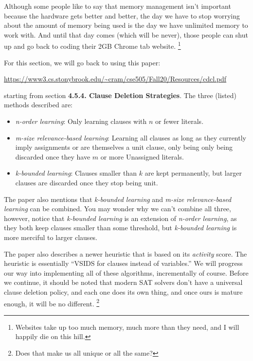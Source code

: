\documentclass[oneside]{book}
\begin{document}
Although some people like to say that memory management isn't important because the 
hardware gets better and better, the day we have to stop worrying about the amount 
of memory being used is the day we have unlimited memory to work with. And until that 
day comes (which will be never), those people can shut up and go back to coding their 
2GB Chrome tab website. 
\footnote{Websites take up too much memory, much more than they need, 
and I will happily die on this hill.}

For this section, we will go back to using this paper:
\begin{center}
    \small{\url{https://www3.cs.stonybrook.edu/~cram/cse505/Fall20/Resources/cdcl.pdf}}
\end{center}
starting from section \textbf{4.5.4. Clause Deletion Strategies}.
The three (listed) methods described are:
\begin{itemize}
    \item \textit{n-order learning}: Only learning clauses with $n$ or fewer literals.
    \item \textit{m-size relevance-based learning}: Learning all clauses as long as they 
            currently imply assignments or are themselves a unit clause, only being
            only being discarded once they have $m$ or more Unassigned literals.
    \item \textit{k-bounded learning}: Clauses smaller than $k$ are kept permanently,
            but larger clauses are discarded once they stop being unit.
\end{itemize}
\noindent
The paper also mentions that \textit{k-bounded learning} and \textit{m-size relevance-based learning}
can be combined. You may wonder why we can't combine all three, however, notice that 
\textit{k-bounded learning} is an extension of \textit{n-order learning}, as they both keep 
clauses smaller than some threshold, but \textit{k-bounded learning} is more merciful to 
larger clauses.

The paper also describes a newer heuristic that is based on its \textit{activity} score. 
The heuristic is essentially ``VSIDS for clauses instead of variables.'' We will progress our 
way into implementing all of these algorithms, incrementally of course. Before we continue, it 
should be noted that modern SAT solvers don't have a universal clause deletion policy, and each 
one does its own thing, and once ours is mature enough, it will be no different.
\footnote{Does that make us all unique or all the same?}
\end{document}
